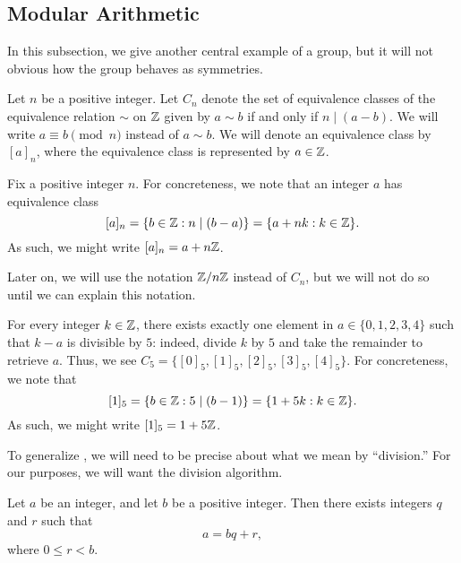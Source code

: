 \documentclass[../main.tex]{subfiles}
\begin{document}
\subsection{Modular Arithmetic} \label{subsec:mods}
In this subsection, we give another central example of a group, but it will not obvious how the group behaves as symmetries.
\begin{definition}
    Let $n$ be a positive integer. Let $C_n$ denote the set of equivalence classes of the equivalence relation $\sim$ on $\mathbb Z$ given by $a\sim b$ if and only if $n\mid(a-b)$. We will write $a\equiv b\pmod n$ instead of $a\sim b$. We will denote an equivalence class by $[a]_n$, where the equivalence class is represented by $a\in\mathbb Z$.
\end{definition}
\begin{remark} \label{rem:concrete-coset}
    Fix a positive integer $n$. For concreteness, we note that an integer $a$ has equivalence class
    \[[a]_n=\{b\in\mathbb Z:n\mid(b-a)\}=\{a+nk:k\in\mathbb Z\}.\]
    As such, we might write $[a]_n=a+n\mathbb Z$.
\end{remark}
Later on, we will use the notation $\mathbb Z/n\mathbb Z$ instead of $C_n$, but we will not do so until we can explain this notation.
\begin{example} \label{ex:mod-5}
    For every integer $k\in\mathbb Z$, there exists exactly one element in $a\in\{0,1,2,3,4\}$ such that $k-a$ is divisible by $5$: indeed, divide $k$ by $5$ and take the remainder to retrieve $a$. Thus, we see $C_5=\{[0]_5,[1]_5,[2]_5,[3]_5,[4]_5\}$. For concreteness, we note that
    \[[1]_5=\{b\in\mathbb Z:5\mid(b-1)\}=\{1+5k:k\in\mathbb Z\}.\]
    As such, we might write $[1]_5=1+5\mathbb Z$.
\end{example}
To generalize , we will need to be precise about what we mean by ``division.'' For our purposes, we will want the division algorithm.
\begin{theorem} \label{thm:division}
    Let $a$ be an integer, and let $b$ be a positive integer. Then there exists integers $q$ and $r$ such that
    \[a=bq+r,\]
    where $0\le r<b$.
\end{theorem}
\end{document}

